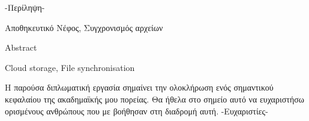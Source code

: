 \begin{abstractgr}
  -Περίληψη-
\begin{keywordsgr}
Αποθηκευτικό Νέφος, Συγχρονισμός αρχείων
\end{keywordsgr}
\end{abstractgr}


\begin{abstracten}
  Abstract
\begin{keywordsen}
Cloud storage, File synchronisation
\end{keywordsen}
\end{abstracten}


\begin{acknowledgementsgr}
  Η παρούσα διπλωματική εργασία σημαίνει την ολοκλήρωση ενός σημαντικού
  κεφαλαίου της ακαδημαϊκής μου πορείας. Θα ήθελα στο σημείο αυτό να
  ευχαριστήσω ορισμένους ανθρώπους που με βοήθησαν στη διαδρομή αυτή.
  -Ευχαριστίες-
\end{acknowledgementsgr}
